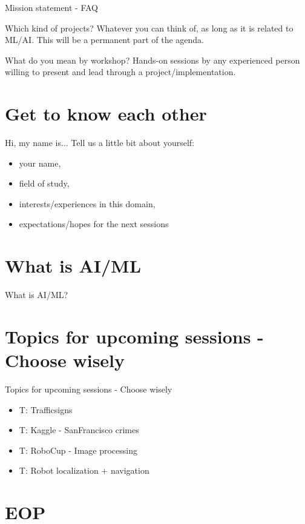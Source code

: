 \documentclass[aspectratio=169]{beamer}
\begin{document}
	\begin{frame}{Mission statement - FAQ}
		\begin{block}{Which kind of projects?}
			Whatever you can think of, as long as it is related to ML/AI. This will be a permanent part of the agenda.
		\end{block}

		\begin{block}{What do you mean by workshop?}
			Hands-on sessions by any experienced person willing to present and lead through a project/implementation.
		\end{block}

	\end{frame}

\section{Get to know each other}
	\begin{frame}{Hi, my name is...}
		Tell us a little bit about yourself: 
		\begin{itemize}
			\item your name, 
			\item field of study,
			\item interests/experiences in this domain,
			\item expectations/hopes for the next sessions
		\end{itemize}
	\end{frame}

\section{What is AI/ML}
	\begin{frame}{What is AI/ML?}
	\end{frame}

\section{Topics for upcoming sessions - Choose wisely}
	\begin{frame}{Topics for upcoming sessions - Choose wisely}
		\begin{itemize}
			\item T: Trafficsigns
			\item T: Kaggle - SanFrancisco crimes
			\item T: RoboCup - Image processing
			\item T: Robot localization + navigation
		\end{itemize}
	\end{frame}

\section{EOP}
\end{document}
